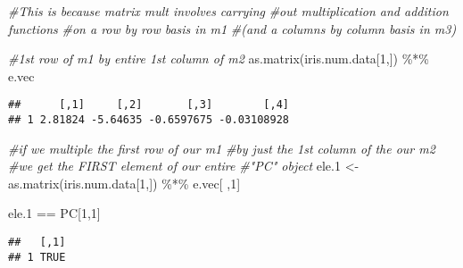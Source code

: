 \documentclass[
]{book}
\newenvironment{Shaded}{\begin{snugshade}}{\end{snugshade}}
\newcommand{\CommentTok}[1]{\textcolor[rgb]{0.56,0.35,0.01}{\textit{#1}}}
\newcommand{\DecValTok}[1]{\textcolor[rgb]{0.00,0.00,0.81}{#1}}
\newcommand{\FloatTok}[1]{\textcolor[rgb]{0.00,0.00,0.81}{#1}}
\newcommand{\FunctionTok}[1]{\textcolor[rgb]{0.00,0.00,0.00}{#1}}
\newcommand{\NormalTok}[1]{#1}
\newcommand{\OtherTok}[1]{\textcolor[rgb]{0.56,0.35,0.01}{#1}}
\newcommand{\SpecialCharTok}[1]{\textcolor[rgb]{0.00,0.00,0.00}{#1}}
\begin{document}
\begin{Shaded}
\begin{Highlighting}[]
\CommentTok{\#This is because matrix mult involves carrying}
\CommentTok{\#out multiplication and addition functions}
\CommentTok{\#on a row by row basis in m1}
\CommentTok{\#(and a columns by column basis in m3)}

\CommentTok{\#1st row of m1 by entire 1st column of m2}
\FunctionTok{as.matrix}\NormalTok{(iris.num.data[}\DecValTok{1}\NormalTok{,]) }\SpecialCharTok{\%*\%}\NormalTok{ e.vec}
\end{Highlighting}
\end{Shaded}

\begin{verbatim}
##      [,1]     [,2]       [,3]        [,4]
## 1 2.81824 -5.64635 -0.6597675 -0.03108928
\end{verbatim}

\begin{Shaded}
\begin{Highlighting}[]
\CommentTok{\#if we multiple the first row of our m1}
\CommentTok{\#by just the 1st column of the our m2}
\CommentTok{\#we get the FIRST element of our entire }
\CommentTok{\#"PC" object}
\NormalTok{ele}\FloatTok{.1} \OtherTok{\textless{}{-}} \FunctionTok{as.matrix}\NormalTok{(iris.num.data[}\DecValTok{1}\NormalTok{,]) }\SpecialCharTok{\%*\%}\NormalTok{ e.vec[ ,}\DecValTok{1}\NormalTok{]}

\NormalTok{ele}\FloatTok{.1} \SpecialCharTok{==}\NormalTok{ PC[}\DecValTok{1}\NormalTok{,}\DecValTok{1}\NormalTok{]}
\end{Highlighting}
\end{Shaded}

\begin{verbatim}
##   [,1]
## 1 TRUE
\end{verbatim}
\end{document}
